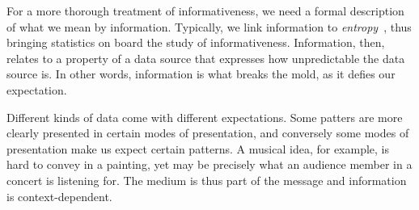 For a more thorough treatment of informativeness, we need a formal description of what we mean by information.
Typically, we link information to \emph{entropy}~\parencite{cover2006elements}, thus bringing statistics on board the study of informativeness.
Information, then, relates to a property of a data source that expresses how unpredictable the data source is.
In other words, information is what breaks the mold, as it defies our expectation.

Different kinds of data come with different expectations.
Some patters are more clearly presented in certain modes of presentation, and conversely some modes of presentation make us expect certain patterns.
A musical idea, for example, is hard to convey in a painting, yet may be precisely what an audience member in a concert is listening for.
The medium is thus part of the message and information is context-dependent.

